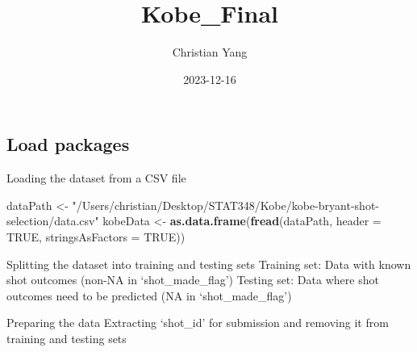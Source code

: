\documentclass[
]{article}
\title{Kobe\_Final}
\author{Christian Yang}
\date{2023-12-16}
\newenvironment{Shaded}{\begin{snugshade}}{\end{snugshade}}
\newcommand{\AttributeTok}[1]{\textcolor[rgb]{0.13,0.29,0.53}{#1}}
\newcommand{\ConstantTok}[1]{\textcolor[rgb]{0.56,0.35,0.01}{#1}}
\newcommand{\FunctionTok}[1]{\textcolor[rgb]{0.13,0.29,0.53}{\textbf{#1}}}
\newcommand{\NormalTok}[1]{#1}
\newcommand{\OtherTok}[1]{\textcolor[rgb]{0.56,0.35,0.01}{#1}}
\newcommand{\SpecialCharTok}[1]{\textcolor[rgb]{0.81,0.36,0.00}{\textbf{#1}}}
\newcommand{\StringTok}[1]{\textcolor[rgb]{0.31,0.60,0.02}{#1}}
\begin{document}
\maketitle

\hypertarget{load-packages}{%
\subsection{Load packages}\label{load-packages}}

Loading the dataset from a CSV file

\begin{Shaded}
\begin{Highlighting}[]
\NormalTok{dataPath }\OtherTok{\textless{}{-}} \StringTok{"/Users/christian/Desktop/STAT348/Kobe/kobe{-}bryant{-}shot{-}selection/data.csv"}
\NormalTok{kobeData }\OtherTok{\textless{}{-}} \FunctionTok{as.data.frame}\NormalTok{(}\FunctionTok{fread}\NormalTok{(dataPath, }\AttributeTok{header =} \ConstantTok{TRUE}\NormalTok{, }\AttributeTok{stringsAsFactors =} \ConstantTok{TRUE}\NormalTok{))}
\end{Highlighting}
\end{Shaded}

Splitting the dataset into training and testing sets Training set: Data
with known shot outcomes (non-NA in `shot\_made\_flag') Testing set:
Data where shot outcomes need to be predicted (NA in `shot\_made\_flag')

\begin{Shaded}
\end{Shaded}

Preparing the data Extracting `shot\_id' for submission and removing it
from training and testing sets

\begin{Shaded}
\end{Shaded}
\end{document}
